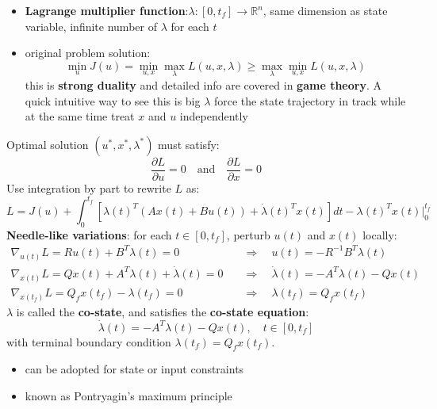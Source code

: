 \documentclass[10pt,a4paper,oneside]{article}
\begin{document}
\begin{itemize}
\item \textbf{Lagrange multiplier function}:$\lambda:[0,t_f]\rightarrow\mathbb{R}^n$, same dimension as state variable, infinite number of $\lambda$ for each $t$
\item original problem solution:
\[
\min _{u} J(u)=\min _{u, x} \max _{\lambda} L(u, x, \lambda) \geq \max _{\lambda} \min _{u, x} L(u, x, \lambda)
\]
this is \textbf{strong duality} and detailed info are covered in \textbf{game theory}. A quick intuitive way to see this is big $\lambda$ force the state trajectory in track while at the same time treat $x$ and $u$ independently
\end{itemize}
Optimal solution $(u^*,x^*,\lambda^*)$ must satisfy:
\[
\frac{\partial L}{\partial u}=0 \quad \text{and} \quad \frac{\partial L}{\partial x}=0
\]
Use integration by part to rewrite $L$ as:
$$
L=J(u)+\int_{0}^{t_{f}}\left[\lambda(t)^{T}(A x(t)+B u(t))+\dot{\lambda}(t)^{T} x(t)\right] d t-\lambda(t)^{T} x\left.(t)\right|_{0} ^{t_{f}}
$$
\textbf{Needle-like variations}: for each $t\in[0,t_f]$, perturb $u(t)$ and $x(t)$ locally:
\begin{align*}
\nabla_{u(t)} L=R u(t)+B^{T} \lambda(t)=0 &  \quad\Rightarrow \quad u(t)=-R^{-1} B^{T} \lambda(t) \\
\nabla_{x(t)} L=Q x(t)+A^{T} \lambda(t)+\dot{\lambda}(t)=0 &  \quad\Rightarrow \quad \dot{\lambda}(t)=-A^{T} \lambda(t)-Q x(t) \\ 
\nabla_{x\left(t_{f}\right)} L=Q_{f} x\left(t_{f}\right)-\lambda\left(t_{f}\right)=0 &  \quad\Rightarrow \quad \lambda\left(t_{f}\right)=Q_{f} x\left(t_{f}\right) 
\end{align*}
$\lambda$ is called the \textbf{co-state}, and satisfies the \textbf{co-state equation}:
\[
\dot{\lambda}(t)=-A^{T} \lambda(t)-Q x(t), \quad t \in\left[0, t_{f}\right]
\]
with terminal boundary condition $\lambda(t_f)=Q_fx(t_f)$.
\begin{itemize}
	\item can be adopted for state or input constraints
	\item known as Pontryagin's maximum principle
\end{itemize}
\end{document}
